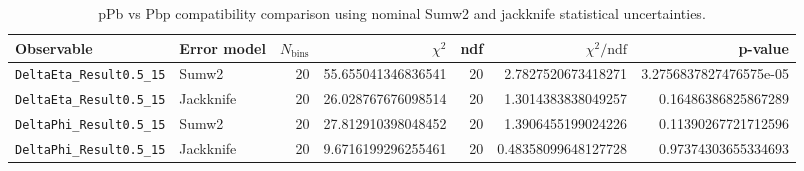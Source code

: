 \begin{table}[htbp]
\centering
\begin{tabular}{|l|l|r|r|r|r|r|}
\hline
Observable & Error model & $N_{\mathrm{bins}}$ & $\chi^2$ & ndf & $\chi^2/\mathrm{ndf}$ & p-value \\
\hline
\texttt{DeltaEta\_Result0.5\_15} & Sumw2 & 20 & 55.655041346836541 & 20 & 2.7827520673418271 & 3.2756837827476575e-05 \\
\texttt{DeltaEta\_Result0.5\_15} & Jackknife & 20 & 26.028767676098514 & 20 & 1.3014383838049257 & 0.16486386825867289 \\
\texttt{DeltaPhi\_Result0.5\_15} & Sumw2 & 20 & 27.812910398048452 & 20 & 1.3906455199024226 & 0.11390267721712596 \\
\texttt{DeltaPhi\_Result0.5\_15} & Jackknife & 20 & 9.6716199296255461 & 20 & 0.48358099648127728 & 0.97374303655334693 \\
\hline
\end{tabular}
\caption{pPb vs Pbp compatibility comparison using nominal Sumw2 and jackknife statistical uncertainties.}
\label{tab:ppbp-sumw2-vs-jackknife-compatibility}
\end{table}
